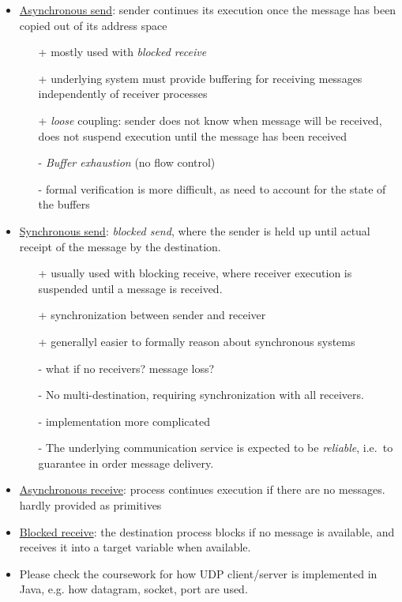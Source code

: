\documentclass[twocolumn,landscape,10pt]{article}
\theoremstyle{definition}
\begin{document}
\begin{itemize}
    \item \underline{Asynchronous send}: sender continues its execution once the
        message has been copied out of its address space
        \begin{itemize}
            \item[+] mostly used with \emph{blocked receive}
            \item[+] underlying system must provide buffering for receiving
                messages independently of receiver processes
            \item[+] \emph{loose} coupling: sender does not know when message will
                be received, does not suspend execution until the message has
                been received
            \item[-] \emph{Buffer exhaustion} (no flow control)
            \item[-] formal verification is more difficult, as need to account
                for the state of the buffers
        \end{itemize} 
    \item \underline{Synchronous send}: \emph{blocked send}, where the sender
        is held up until actual receipt of the message by the destination.
        \begin{itemize}
            \item[+] usually used with blocking receive, where receiver
                execution is suspended until a message is received.
            \item[+] synchronization between sender and receiver
            \item[+] generallyl easier to formally reason about synchronous
                systems
            \item[-] what if no receivers? message loss?
            \item[-] No multi-destination, requiring synchronization with all
                receivers.
            \item[-] implementation more complicated
            \item[-] The underlying communication service is expected to be
                \emph{reliable}, i.e.\ to guarantee in order message delivery.
        \end{itemize} 
    \item \underline{Asynchronous receive}: process continues execution if there
        are no messages. hardly provided as primitives
    \item \underline{Blocked receive}: the destination process blocks if no
        message is available, and receives it into a target variable when
        available.
    \item Please check the coursework for how UDP client/server is implemented in Java, 
        e.g. how datagram, socket, port are used.
\end{itemize} 
\end{document}
